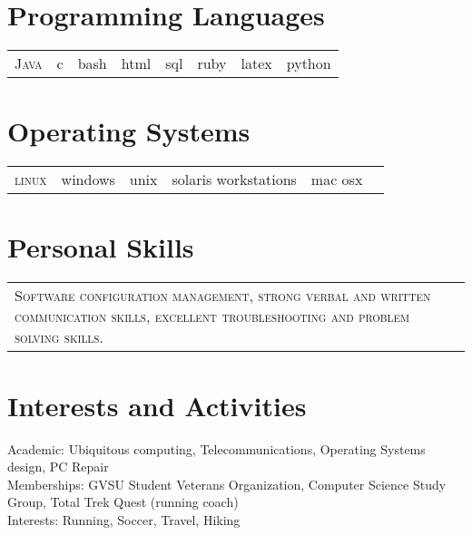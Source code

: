 \documentclass[a4paper,10pt]{article}
\newcommand{\fivenotes}{%
\textcolor{noteone}{\symbol{"2022}}
\textcolor{notetwo}{\symbol{"2022}}
\textcolor{notethree}{\symbol{"2022}}
\textcolor{notefour}{\symbol{"2022}}
\textcolor{notefive}{\symbol{"2022}}
}
\newcommand{\fournotes}{%
\textcolor{noteone}{\symbol{"2022}}
\textcolor{notetwo}{\symbol{"2022}}
\textcolor{notethree}{\symbol{"2022}}
\textcolor{notefour}{\symbol{"2022}}
\textcolor{white}{\symbol{"2022}}
}
\newcommand{\threenotes}{%
\textcolor{noteone}{\symbol{"2022}}
\textcolor{notetwo}{\symbol{"2022}}
\textcolor{notethree}{\symbol{"2022}}
\textcolor{white}{\symbol{"2022}}
\textcolor{white}{\symbol{"2022}}
}
\newcommand{\twonotes}{%
\textcolor{noteone}{\symbol{"2022}}
\textcolor{notetwo}{\symbol{"2022}}
\textcolor{white}{\symbol{"2022}}
\textcolor{white}{\symbol{"2022}}
\textcolor{white}{\symbol{"2022}}
}
\begin{document}
\hfill

\section{Programming Languages}
\begin{tabular}{r r r r r r r r}
  \textsc{Java}\small\emph{\fournotes} & c \small\emph{\fournotes} & bash \small\emph{\fournotes} & html \small\emph{\fournotes} & sql \small\emph{\threenotes}
   & ruby \small\emph{\threenotes}  & latex  \small\emph{\threenotes} & python \small\emph{\twonotes}
\end{tabular}

\section{Operating Systems}
\begin{tabular}{r r r r r r }
 \textsc{linux}\small\emph{\fivenotes} & windows \small\emph{\fournotes} & unix\small\emph{\fournotes} & solaris workstations \small\emph{\threenotes} & mac osx\small\emph{\threenotes}
\end{tabular}

\section{Personal Skills}
 \begin{tabular}{p{15.5cm}}
 \textsc{Software configuration management, strong verbal and written communication skills, excellent troubleshooting and problem solving skills.}
\end{tabular}

\section{Interests and Activities}
Academic: Ubiquitous computing, Telecommunications, Operating Systems design, PC Repair\\
Memberships: GVSU Student Veterans Organization, Computer Science Study Group, Total Trek Quest (running coach)\\
Interests: Running, Soccer, Travel, Hiking
\end{document}
